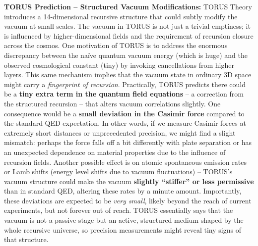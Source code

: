 \documentclass[
]{article}
\begin{document}
\textbf{TORUS Prediction -- Structured Vacuum Modifications:} TORUS
Theory introduces a 14-dimensional recursive structure that could subtly
modify the vacuum at small scales. The vacuum in TORUS is not just a
trivial emptiness; it is influenced by higher-dimensional fields and the
requirement of recursion closure across the cosmos. One motivation of
TORUS is to address the enormous discrepancy between the naïve quantum
vacuum energy (which is huge) and the observed cosmological constant
(tiny) by invoking cancellations from higher layers\hspace{0pt}. This
same mechanism implies that the vacuum state in ordinary 3D space might
carry a \emph{fingerprint of recursion}. Practically, TORUS predicts
there could be a \textbf{tiny extra term in the quantum field equations}
-- a correction from the structured recursion -- that alters vacuum
correlations slightly\hspace{0pt}. One consequence would be a
\textbf{small deviation in the Casimir force} compared to the standard
QED expectation\hspace{0pt}. In other words, if we measure Casimir
forces at extremely short distances or unprecedented precision, we might
find a slight mismatch: perhaps the force falls off a bit differently
with plate separation or has an unexpected dependence on material
properties due to the influence of recursion fields. Another possible
effect is on atomic spontaneous emission rates or Lamb shifts (energy
level shifts due to vacuum fluctuations) -- TORUS's vacuum structure
could make the vacuum \textbf{slightly ``stiffer'' or less permissive}
than in standard QED, altering these rates by a minute
amount\hspace{0pt}. Importantly, these deviations are expected to be
\emph{very small}, likely beyond the reach of current experiments, but
not forever out of reach\hspace{0pt}. TORUS essentially says that the
vacuum is not a passive stage but an active, structured medium shaped by
the whole recursive universe, so precision measurements might reveal
tiny signs of that structure.
\end{document}
